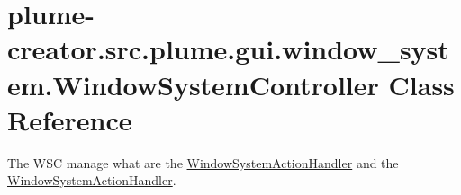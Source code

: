\hypertarget{classplume-creator_1_1src_1_1plume_1_1gui_1_1window__system_1_1_window_system_controller}{}\section{plume-\/creator.src.\+plume.\+gui.\+window\+\_\+system.\+Window\+System\+Controller Class Reference}
\label{classplume-creator_1_1src_1_1plume_1_1gui_1_1window__system_1_1_window_system_controller}


The W\+SC manage what are the \hyperlink{classplume-creator_1_1src_1_1plume_1_1gui_1_1window__system_1_1_window_system_action_handler}{Window\+System\+Action\+Handler} and the \hyperlink{classplume-creator_1_1src_1_1plume_1_1gui_1_1window__system_1_1_window_system_action_handler}{Window\+System\+Action\+Handler}.  


